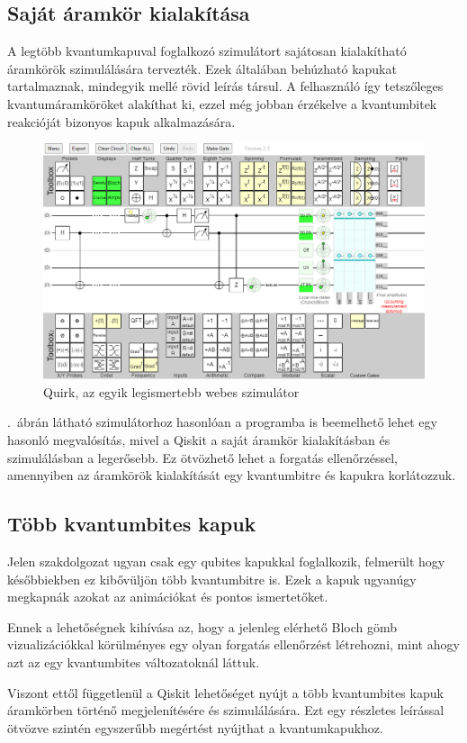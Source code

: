 \documentclass[
]{thesis-ekf}
\theoremstyle{definition}
\theoremstyle{remark}
\begin{document}
\subsection{Saját áramkör kialakítása}
A legtöbb kvantumkapuval foglalkozó szimulátort sajátosan kialakítható áramkörök szimulálására tervezték. Ezek általában behúzható kapukat tartalmaznak, mindegyik mellé rövid leírás társul. A felhasználó így tetszőleges kvantumáramköröket alakíthat ki, ezzel még jobban érzékelve a kvantumbitek reakcióját bizonyos kapuk alkalmazására.

\begin{figure}[H]
	\centering
	\includegraphics[width=0.5\linewidth]{Simulation}
	\caption{Quirk, az egyik legismertebb webes szimulátor}
	\label{fig:simulation}
\end{figure}

\Az{\ref{fig:simulation}}.~ábrán látható szimulátorhoz hasonlóan a programba is beemelhető lehet egy hasonló megvalósítás, mivel a Qiskit a saját áramkör kialakításban és szimulálásban a legerősebb. Ez ötvözhető lehet a forgatás ellenőrzéssel, amennyiben az áramkörök kialakítását egy kvantumbitre és kapukra korlátozzuk.

\subsection{Több kvantumbites kapuk}
Jelen szakdolgozat ugyan csak egy qubites kapukkal foglalkozik, felmerült hogy későbbiekben ez kibővüljön több kvantumbitre is. Ezek a kapuk ugyanúgy megkapnák azokat az animációkat és pontos ismertetőket.

Ennek a lehetőségnek kihívása az, hogy a jelenleg elérhető Bloch gömb vizualizációkkal körülményes egy olyan forgatás ellenőrzést létrehozni, mint ahogy azt az egy kvantumbites változatoknál láttuk.

Viszont ettől függetlenül a Qiskit lehetőséget nyújt a több kvantumbites kapuk áramkörben történő megjelenítésére és szimulálására. Ezt egy részletes leírással ötvözve szintén egyszerűbb megértést nyújthat a kvantumkapukhoz.
\end{document}

